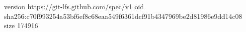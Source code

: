 version https://git-lfs.github.com/spec/v1
oid sha256:c70f993254a53bf6ef8c68eaa549f6361dcf91b4347969be2d81986e9dd14c08
size 174916

